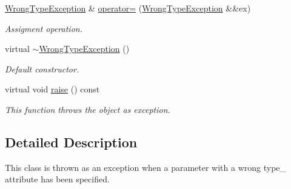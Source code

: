 \begin{DoxyCompactItemize}
\hyperlink{class_dynamic_fast_buffers_1_1_wrong_type_exception}{Wrong\-Type\-Exception} \& \hyperlink{class_dynamic_fast_buffers_1_1_wrong_type_exception_a6e450e15baebd0d9fb5916fbbdee2223}{operator=} (\hyperlink{class_dynamic_fast_buffers_1_1_wrong_type_exception}{Wrong\-Type\-Exception} \&\&ex)
\begin{DoxyCompactList}\small\item\em Assigment operation. \end{DoxyCompactList}\item 
\hypertarget{class_dynamic_fast_buffers_1_1_wrong_type_exception_a41e8593578db20c2453dc6757168dcbe}{virtual \hyperlink{class_dynamic_fast_buffers_1_1_wrong_type_exception_a41e8593578db20c2453dc6757168dcbe}{$\sim$\-Wrong\-Type\-Exception} ()}\label{class_dynamic_fast_buffers_1_1_wrong_type_exception_a41e8593578db20c2453dc6757168dcbe}

\begin{DoxyCompactList}\small\item\em Default constructor. \end{DoxyCompactList}\item 
\hypertarget{class_dynamic_fast_buffers_1_1_wrong_type_exception_a03de92f7045c4b4ec8577579dedd2936}{virtual void \hyperlink{class_dynamic_fast_buffers_1_1_wrong_type_exception_a03de92f7045c4b4ec8577579dedd2936}{raise} () const }\label{class_dynamic_fast_buffers_1_1_wrong_type_exception_a03de92f7045c4b4ec8577579dedd2936}

\begin{DoxyCompactList}\small\item\em This function throws the object as exception. \end{DoxyCompactList}\end{DoxyCompactItemize}


\subsection{Detailed Description}
This class is thrown as an exception when a parameter with a wrong type\-\_\- attribute has been specified. 

